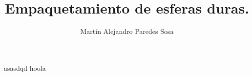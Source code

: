 \documentclass[12pt, journal, a4paper]{IEEEtran}
\author{Martin Alejandro Paredes Sosa}
\title{Empaquetamiento de esferas duras.}
\begin{document}
\maketitle
asasdqd hoola\cite{berryman}





\end{document}
